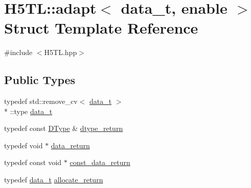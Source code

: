 \hypertarget{struct_h5_t_l_1_1adapt}{\section{H5\-T\-L\-:\-:adapt$<$ data\-\_\-t, enable $>$ Struct Template Reference}
\label{struct_h5_t_l_1_1adapt}
}


{\ttfamily \#include $<$H5\-T\-L.\-hpp$>$}

\subsection*{Public Types}
\begin{DoxyCompactItemize}
\item 
typedef std\-::remove\-\_\-cv$<$ \hyperlink{struct_h5_t_l_1_1adapt_a6c6e6e0f27f796ef1a3736c48241b0f4}{data\-\_\-t} $>$\\*
\-::type \hyperlink{struct_h5_t_l_1_1adapt_a6c6e6e0f27f796ef1a3736c48241b0f4}{data\-\_\-t}
\item 
typedef const \hyperlink{class_h5_t_l_1_1_d_type}{D\-Type} \& \hyperlink{struct_h5_t_l_1_1adapt_a7f65229bd91a684cccf110fd225f8fb1}{dtype\-\_\-return}
\item 
typedef void $\ast$ \hyperlink{struct_h5_t_l_1_1adapt_a2899b8de59577b8c62a32c66e14a0243}{data\-\_\-return}
\item 
typedef const void $\ast$ \hyperlink{struct_h5_t_l_1_1adapt_a144eb8e2bcf76c4e10090c55ef208b2b}{const\-\_\-data\-\_\-return}
\item 
typedef \hyperlink{struct_h5_t_l_1_1adapt_a6c6e6e0f27f796ef1a3736c48241b0f4}{data\-\_\-t} \hyperlink{struct_h5_t_l_1_1adapt_afc28c20e3ef90736e37e24cc8686fee6}{allocate\-\_\-return}
\end{DoxyCompactItemize}
